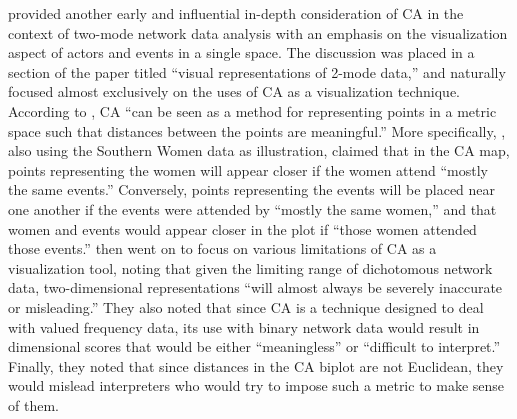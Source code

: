 \documentclass[a4paper,fleqn]{cas-sc}
\begin{document}
\citet{borgatti1997network} provided another early and influential in-depth consideration of CA in the context of two-mode network data analysis with an emphasis on the visualization aspect of actors and events in a single space. The discussion was placed in a section of the paper titled ``visual representations of 2-mode data,'' and naturally focused almost exclusively on the uses of CA as a visualization technique. According to \citet[246]{borgatti1997network}, CA ``can be seen as a method for representing points in a metric space such that distances between the points are meaningful.'' More specifically, \citet{borgatti1997network}, also using the Southern Women data as illustration,  claimed that in the CA map, points representing the women will appear closer if the women attend ``mostly the same events.'' Conversely, points representing the events will be placed near one another if the events were attended by ``mostly the same women,'' and that women and events would appear closer in the plot if ``those women attended those events.'' \citet[247-249]{borgatti1997network} then went on to focus on various limitations of CA as a visualization tool, noting that given the limiting range of dichotomous network data, two-dimensional representations ``will almost always be severely inaccurate or misleading.'' They also noted that since CA is a technique designed to deal with valued frequency data, its use with binary network data would result in dimensional scores that would be either ``meaningless'' or ``difficult to interpret.'' Finally, they noted that since distances in the CA biplot are not Euclidean, they would mislead interpreters who would try to impose such a metric to make sense of them. 
\end{document}
